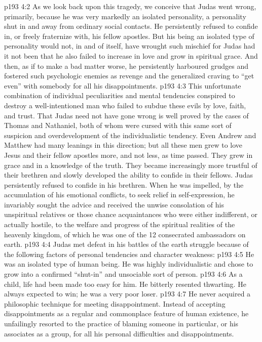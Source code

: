 \vs p193 4:2 As we look back upon this tragedy, we conceive that Judas went wrong, primarily, because he was very markedly an isolated personality, a personality shut in and away from ordinary social contacts. He persistently refused to confide in, or freely fraternize with, his fellow apostles. But his being an isolated type of personality would not, in and of itself, have wrought such mischief for Judas had it not been that he also failed to increase in love and grow in spiritual grace. And then, as if to make a bad matter worse, he persistently harboured grudges and fostered such psychologic enemies as revenge and the generalized craving to “get even” with somebody for all his disappointments.
\vs p193 4:3 This unfortunate combination of individual peculiarities and mental tendencies conspired to destroy a well\hyp{}intentioned man who failed to subdue these evils by love, faith, and trust. That Judas need not have gone wrong is well proved by the cases of Thomas and Nathaniel, both of whom were cursed with this same sort of suspicion and overdevelopment of the individualistic tendency. Even Andrew and Matthew had many leanings in this direction; but all these men grew to love Jesus and their fellow apostles more, and not less, as time passed. They grew in grace and in a knowledge of the truth. They became increasingly more trustful of their brethren and slowly developed the ability to confide in their fellows. Judas persistently refused to confide in his brethren. When he was impelled, by the accumulation of his emotional conflicts, to seek relief in self\hyp{}expression, he invariably sought the advice and received the unwise consolation of his unspiritual relatives or those chance acquaintances who were either indifferent, or actually hostile, to the welfare and progress of the spiritual realities of the heavenly kingdom, of which he was one of the 12 consecrated ambassadors on earth.
\vs p193 4:4 Judas met defeat in his battles of the earth struggle because of the following factors of personal tendencies and character weakness:
\vs p193 4:5 \bibnobreakspace He was an isolated type of human being. He was highly individualistic and chose to grow into a confirmed “shut\hyp{}in” and unsociable sort of person.
\vs p193 4:6 \bibnobreakspace As a child, life had been made too easy for him. He bitterly resented thwarting. He always expected to win; he was a very poor loser.
\vs p193 4:7 \bibnobreakspace He never acquired a philosophic technique for meeting disappointment. Instead of accepting disappointments as a regular and commonplace feature of human existence, he unfailingly resorted to the practice of blaming someone in particular, or his associates as a group, for all his personal difficulties and disappointments.
